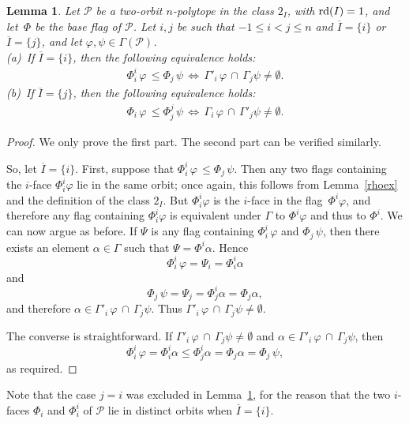 \documentclass[12pt]{article}
\renewcommand{\phi}{\varphi}
\renewcommand{\bar}{\overline}
\renewcommand{\>}{\rangle}
\renewcommand{\leq}{\leqslant}
\newtheorem{lemma}[theorem]{Lemma}
\theoremstyle{definition}\newtheorem{definition}{Definition}[section]
\begin{document}
\begin{lemma}
\label{incnminus1}
Let $\mathcal{P}$ be a two-orbit $n$-polytope in the class $2_I$, with ${\rm rd}(I)=1$, and let~$\Phi$ be the base flag of $\mathcal{P}$. Let $i,j$ be such that $-1 \leq i < j \leq n$ and $\bar{I}=\{i\}$ or $\bar{I} = \{j\}$, and let $\phi,\psi \in \Gamma(\mathcal{P})$. \\[.04in]
(a)\ If $\bar{I} = \{i\}$, then the following equivalence holds: 
\begin{eqnarray}
\label{equiv_n-1A}
\Phi^i_i\,\phi\, \leq \Phi_j\,\psi  \,\Longleftrightarrow\, \Gamma'_i\,\phi \,\cap \,\Gamma_j \psi \neq \emptyset.
\end{eqnarray}
(b)\ If $\bar{I} = \{j\}$, then the following equivalence holds: 
\begin{eqnarray}
\label{equiv_n-1B}
\Phi_i\,\phi\, \leq \Phi^{j}_{j}\,\psi \,\Longleftrightarrow\, \Gamma_i\,\phi \,\cap\, \Gamma'_{j} \psi \neq \emptyset.
\end{eqnarray}
\end{lemma}

\begin{proof}
We only prove the first part. The second part can be verified similarly.

So, let $\bar{I} = \{i\}$. First, suppose that $\Phi^i_i\,\phi\, \leq \Phi_j\,\psi$. Then any two flags containing the $i$-face $\Phi^i_i\phi$ lie in the same orbit; once again, this follows from Lemma~\ref{rhoex} and the definition of the class $2_I$. But $\Phi_i^i\phi$ is the $i$-face in the flag~$\Phi^i\phi$, and therefore any flag containing $\Phi_i^i\phi$ is equivalent under $\Gamma$ to $\Phi^i\phi$ and thus to $\Phi^i$. We can now argue as before. If $\Psi$ is any flag containing $\Phi^i_i\,\phi$ and $\Phi_j\,\psi$, then there exists an element $\alpha \in \Gamma$ such that $\Psi=\Phi^i \alpha$. Hence 
\[\Phi^i_i\,\phi =\Psi_{i}= \Phi^i_i \alpha\] 
and 
\[\Phi_j\,\psi =\Psi_{j} = \Phi_j^i \alpha = \Phi_j \alpha,\] 
and therefore $\alpha \in  \Gamma'_i\,\phi \,\cap \,\Gamma_j \psi$. Thus $\Gamma'_i\,\phi \,\cap \,\Gamma_j \psi\neq\emptyset$. 

The converse is straightforward. If $\Gamma'_i\,\phi \,\cap \,\Gamma_j \psi\neq\emptyset$ and $\alpha \in  \Gamma'_i\,\phi \,\cap \,\Gamma_j \psi$, then 
\[\Phi^i_i\,\phi =\Phi^i_i \alpha\leq \Phi_j^i \alpha=\Phi_j \alpha=\Phi_j\,\psi,\]
as required.
\end{proof}
\smallskip

Note that the case $j=i$ was excluded in Lemma~\ref{incnminus1}, for the reason that the two $i$-faces $\Phi_i$ and $\Phi^i_i$ of $\mathcal{P}$ lie in distinct orbits when $\bar{I}=\{i\}$.
\smallskip
\end{document}
